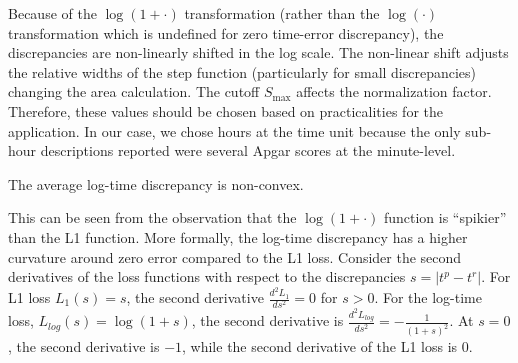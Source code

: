 Because of the $\log(1 + \cdot)$ transformation (rather than the $\log(\cdot)$ transformation which is undefined for zero time-error discrepancy), the discrepancies are non-linearly shifted in the log scale.  The non-linear shift adjusts the relative widths of the step function (particularly for small discrepancies) changing the area calculation.  The cutoff $S_\text{max}$ affects the normalization factor.  Therefore, these values should be chosen based on practicalities for the application.  In our case, we chose hours at the time unit because the only sub-hour descriptions reported were several Apgar scores at the minute-level.

\begin{remark}
    The average log-time discrepancy is non-convex.
\end{remark}
This can be seen from the observation that the $\log(1+\cdot)$ function is ``spikier'' than the L1 function. More formally, the log-time discrepancy has a higher curvature around zero error compared to the L1 loss. Consider the second derivatives of the loss functions with respect to the discrepancies $s = |t^p - t^r|$.  For L1 loss $L_1(s) = s$, the second derivative $\frac{d^2 L_1}{ds^2} = 0$ for $s > 0$.
For the log-time loss, $L_{log}(s) = \log(1 + s)$, the second derivative is $\frac{d^2 L_{log}}{ds^2} = -\frac{1}{(1 + s)^2}$. At $s = 0$, the second derivative is $-1$, while the second derivative of the L1 loss is $0$.

